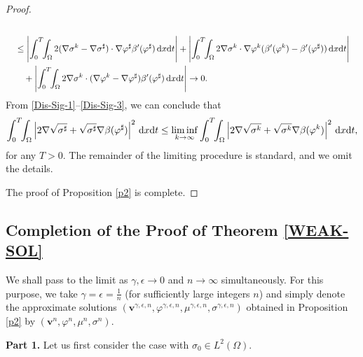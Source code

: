\documentclass[11pt,reqno]{amsart}
\def\d{{\rm d}}
\begin{document}
\begin{proof}
\begin{align}
\notag \\
&\quad \leq \left|\int_0^T\!\! \int_{\Omega} 2 (\nabla \sigma^k -\nabla \sigma^{\sharp} )\cdot \nabla\varphi^{\sharp}  \beta'(\varphi^{\sharp}) \, \d x\d t \right|
+ \left|\int_0^T\!\! \int_{\Omega} 2 \nabla \sigma^k \cdot \nabla \varphi^k(\beta'(\varphi^k)- \beta'(\varphi^{\sharp}))  \, \d x\d t\right|
\notag \\
&\qquad
+ \left|\int_0^T\!\! \int_{\Omega} 2 \nabla \sigma^k \cdot (\nabla \varphi^k- \nabla \varphi^{\sharp}) \beta'(\varphi^{\sharp}) \, \d x\d t\right|
\to 0.
\label{Dis-Sig-3}
\end{align}
%
From \eqref{Dis-Sig-1}--\eqref{Dis-Sig-3}, we can conclude that
$$
\int_0^T \!\! \int_\Omega \left| 2\nabla \sqrt{\sigma^{\sharp}} + \sqrt{\sigma^{\sharp}} \nabla \beta(\varphi^{\sharp}) \right|^2 \, \mathrm{d}x\d t
\leq
\liminf_{k \to \infty} \int_0^T\!\!  \int_\Omega \left| 2\nabla \sqrt{\sigma^k} + \sqrt{\sigma^k} \nabla \beta(\varphi^k) \right|^2 \, \mathrm{d}x\d t,
$$
for any $T>0$. The remainder of the limiting procedure is standard, and we omit the details.

The proof of Proposition \ref{p2} is complete.
\end{proof}


\subsection{Completion of the Proof of Theorem \ref{WEAK-SOL}}
\label{proof-thm1}
We shall pass to the limit as $\gamma, \epsilon \to 0$ and $n\to \infty$ simultaneously. For this purpose, we take $\gamma=\epsilon=\frac{1}{n}$ (for sufficiently large integers $n$) and simply denote the approximate solutions $(\bm{v}^{\gamma,\epsilon,n},\varphi^{\gamma,\epsilon,n}, \mu^{\gamma,\epsilon,n}, \sigma^{\gamma,\epsilon,n})$ obtained in Proposition \ref{p2} by $(\bm{v}^{n},\varphi^{n},\mu^{n}, \sigma^{n})$.
\medskip

\textbf{Part 1.} Let us first consider the case with $\sigma_0\in L^2(\Omega)$.
\end{document}
